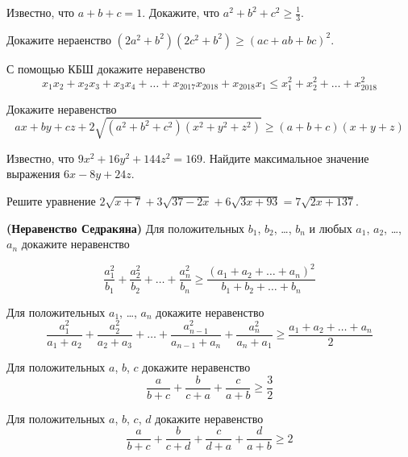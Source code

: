 \resetproblem \begingroup %
    \def\jeolmdate{5 декабря 2018 г.}%
\jeolmheader \endgroup


\begin{problems}

\item Известно, что $a+b+c = 1$. Докажите, что $a^2 + b^2 + c^2 \geqslant \frac{1}{3}$.

\item Докажите нераенство $(2a^2 + b^2) (2c^2 + b^2) \geqslant (ac + ab + bc) ^2$.

\item С помощью КБШ докажите неравенство $$x_1x_2 + x_2x_3 + x_3x_4 + \ldots + x_{2017}x_{2018} + x_{2018}x_1 \leqslant x_1^2 + x_2^2 + \ldots + x_{2018}^2$$


\item Докажите неравенство $$ ax + by + cz + 2\sqrt{(a^2 + b^2 + c^2)(x^2 + y^2 + z^2)} \geqslant (a+b+c)(x+y+z)$$

\end{problems}

\hrulefill

\begin{problems}

\item Известно, что $9x^2 + 16y^2 + 144z^2 = 169$. Найдите максимальное значение выражения $6x - 8y + 24 z$.

\item Решите уравнение $2\sqrt{x+7} + 3\sqrt{37-2x} + 6\sqrt{3x + 93} = 7\sqrt{2x+137}$.

\end{problems}

\hrulefill

\begin{problems}

\item \textbf{(Неравенство Седракяна)} Для положительных $b_1$, $b_2$, \ldots, $b_n$ и любых $a_1$, $a_2$, \ldots, $a_n$ докажите неравенство 

$$\frac{a_1^2}{b_1} + \frac{a_2^2}{b_2}+\ldots+\frac{a_n^2}{b_n} \geqslant \frac{(a_1+a_2+\ldots + a_n)^2}{b_1+b_2+\ldots+b_n}$$

\item Для положительных $a_1$, \ldots, $a_n$ докажите неравенство $$\frac{a_1^2}{a_1 + a_2} + \frac{a_2^2}{a_2+a_3} + \ldots + \frac{a_{n-1}^2}{a_{n-1}+a_n} + \frac{a_n^2}{a_n+a_1} \geqslant \frac{a_1 + a_2 + \ldots + a_n}{2}$$

\item Для положительных $a$, $b$, $c$ докажите неравенство $$\frac{a}{b+c} + \frac{b}{c+a} + \frac{c}{a+b} \geqslant \frac{3}{2}$$

\item Для положительных $a$, $b$, $c$, $d$ докажите неравенство $$\frac{a}{b+c} + \frac{b}{c+d} + \frac{c}{d+a} + \frac{d}{a+b} \geqslant 2$$

\end{problems}

